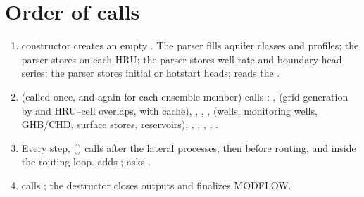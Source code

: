 \section{Order of calls}
\begin{enumerate}
\item {} constructor creates an empty . The  parser fills aquifer classes and
profiles; the  parser stores  on each HRU; the  parser stores well-rate and
boundary-head series; the  parser stores initial or hotstart heads;  reads the .
\item {} (called once, and again for each ensemble member) calls
: ,  (grid generation by  and HRU--cell overlaps, with cache), ,
, ,  (wells, monitoring wells, GHB/CHD, surface stores, reservoirs),
, , , , .
\item Every step,  () calls  after the lateral processes, then
 before routing, and  inside the routing loop.
 adds ;  asks .
\item {} calls ; the destructor closes outputs and finalizes MODFLOW.
\end{enumerate}

